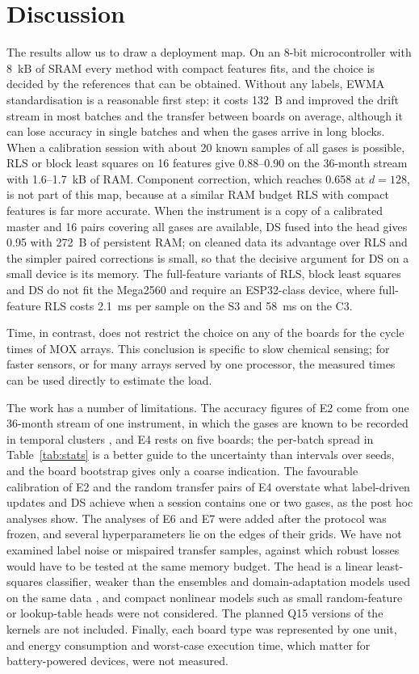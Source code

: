 \documentclass[journal,twoside,web]{ieeecolor}
\begin{document}
\section{Discussion}
\label{sec:discussion}
The results allow us to draw a deployment map. On an 8-bit microcontroller with 8~kB of SRAM every method with compact features fits, and the choice is decided by the references that can be obtained. Without any labels, EWMA standardisation is a reasonable first step: it costs 132~B and improved the drift stream in most batches and the transfer between boards on average, although it can lose accuracy in single batches and when the gases arrive in long blocks. When a calibration session with about 20 known samples of all gases is possible, RLS or block least squares on 16 features give 0.88--0.90 on the 36-month stream with 1.6--1.7~kB of RAM. Component correction, which reaches 0.658 at $d=128$, is not part of this map, because at a similar RAM budget RLS with compact features is far more accurate. When the instrument is a copy of a calibrated master and 16 pairs covering all gases are available, DS fused into the head gives 0.95 with 272~B of persistent RAM; on cleaned data its advantage over RLS and the simpler paired corrections is small, so that the decisive argument for DS on a small device is its memory. The full-feature variants of RLS, block least squares and DS do not fit the Mega2560 and require an ESP32-class device, where full-feature RLS costs 2.1~ms per sample on the S3 and 58~ms on the C3.

Time, in contrast, does not restrict the choice on any of the boards for the cycle times of MOX arrays. This conclusion is specific to slow chemical sensing; for faster sensors, or for many arrays served by one processor, the measured times can be used directly to estimate the load.

The work has a number of limitations. The accuracy figures of E2 come from one 36-month stream of one instrument, in which the gases are known to be recorded in temporal clusters \cite{dennler}, and E4 rests on five boards; the per-batch spread in Table~\ref{tab:stats} is a better guide to the uncertainty than intervals over seeds, and the board bootstrap gives only a coarse indication. The favourable calibration of E2 and the random transfer pairs of E4 overstate what label-driven updates and DS achieve when a session contains one or two gases, as the post hoc analyses show. The analyses of E6 and E7 were added after the protocol was frozen, and several hyperparameters lie on the edges of their grids. We have not examined label noise or mispaired transfer samples, against which robust losses would have to be tested at the same memory budget. The head is a linear least-squares classifier, weaker than the ensembles and domain-adaptation models used on the same data \cite{vergara,zhang,mida}, and compact nonlinear models such as small random-feature or lookup-table heads were not considered. The planned Q15 versions of the kernels are not included. Finally, each board type was represented by one unit, and energy consumption and worst-case execution time, which matter for battery-powered devices, were not measured.
\end{document}
